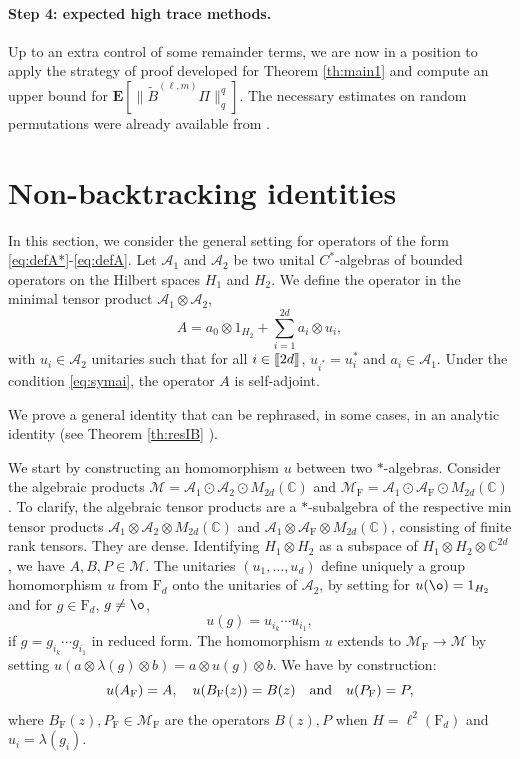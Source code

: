 \documentclass[11pt]{article}
\renewcommand{\star}{{\mathrm{F}}}
\newcommand{\cA}{\mathcal{A}}
\newcommand{\dE}{\mathbf {E}}
\newcommand{\dF}{\mathrm{F}}
\newcommand{\dC}{\mathbb {C}}
\newcommand{\cM}{\mathcal {M}}
\newcommand{\1}{1\!\!{\sf I}}
\newcommand{\INT}[1]{{{\left[\hspace{-1.4pt}\left[#1\right]\hspace{-1.4pt}\right]}}}
\begin{document}
\paragraph{Step 4: expected high trace methods. } Up to an extra control of some remainder terms, we are now
in a position to apply the strategy of proof developed for Theorem \ref{th:main1} and compute an upper bound for $\dE [ \| \widetilde B^{(\ell,m)} \Pi \|_q ^q]$. The necessary estimates on random permutations were already available from \cite{MR3792625,MR4024563}.


\section{Non-backtracking identities}
\label{sec:nonback}

In this section, we consider the general setting for operators of the form \eqref{eq:defA*}-\eqref{eq:defA}. Let $\cA_1$ and $\cA_2$ be two unital $C^*$-algebras of bounded operators on the Hilbert spaces $H_1$ and $H_2$. We define the operator in the minimal tensor product $\cA_1 \otimes \cA_2$,
\begin{equation}\label{eq:defAH}
A = a_0 \otimes 1_{H_2}  + \sum_{i=1}^{2d} a_i \otimes u_i,
\end{equation}
with $u_i \in \cA_2$ unitaries such that for all $i \in \INT{2d}$, $u_{i^*} = u_i^*$ and $a_i \in \cA_1$. Under the condition  \eqref{eq:symai}, the operator $A$ is self-adjoint.

We  prove a general identity that can be rephrased, in some cases, in an analytic identity (see Theorem  \ref{th:resIB} ).

We start by constructing an homomorphism $u$ between two $*$-algebras.
Consider the algebraic products $\cM = \cA_1 \odot \cA_2 \odot M_{2d} (\dC)$ and $\cM_\star = \cA_1 \odot \cA_\star \odot M_{2d} (\dC)$. 
To clarify, the algebraic tensor products are a $*$-subalgebra of the respective min
tensor products $\cA_1 \otimes \cA_2 \otimes M_{2d} (\dC)$ and $\cA_1 \otimes \cA_\star \otimes M_{2d} (\dC)$, consisting of finite rank tensors. They are dense. 
Identifying $H_1 \otimes H_2$ as a subspace of $H_1 \otimes H_2 \otimes \dC^{2d}$, we have $A , B, P \in \cM$. 
The unitaries $(u_1, \ldots, u_d)$ define uniquely a group  homomorphism $u $ from $\dF_d$ onto the unitaries of $\cA_2$, by setting for $u(\o) = 1_{H_2}$ and for $g \in \dF_d$, $g \ne \o$, 
\begin{equation}\label{eq-def-u}
u(g)= u_{i_k} \cdots u_{i_1},  
\end{equation}
if $g = g_{i_k} \cdots g_{i_1}$ in reduced form. The homomorphism $u$ extends to $\cM_\star \to \cM$ by setting  $u (a \otimes \lambda (g) \otimes b ) = a \otimes u(g) \otimes b$. We have by construction: 
$$
u(A_\star) = A,  \quad u (B_\star(z)) = B(z) \quad \hbox{and} \quad u(P_\star) = P ,
$$
where $B_\star(z), P_\star \in \cM_\star$ are the operators $B(z),P$ when $H = \ell^{2} (\dF_d)$ and $u_i = \lambda(g_i)$. 
\end{document}
